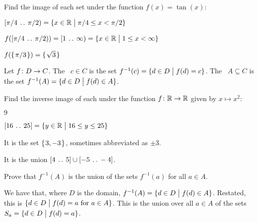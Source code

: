 \documentclass{ibl}  %
\begin{document}
\begin{ex}
Find the image of each set under the function $f(x)=\tan(x)$:
\begin{items}
\item $[\pi/4\:\mathinner{\ldotp\ldotp}\:\pi/2)=\{x\in\mathbb{R} \bigm| \pi/4\leq x<\pi/2\}$
\item {}
\end{items}
\begin{ans}
\begin{items}
\item $f([\pi/4\:\mathinner{\ldotp\ldotp}\:\pi/2))=[1\:\mathinner{\ldotp\ldotp}\:\infty)
             =\{x\in\mathbb{R} \bigm| 1\leq x<\infty\}$ 
\item $f(\mbox{$\{\hspace{0.1em}\pi/3\hspace{0.1em}\}$})=\mbox{$\{\hspace{0.1em}\sqrt{3}\hspace{0.1em}\}$}$
\end{items}
\end{ans}
\end{ex}

\begin{df}
Let $\mbox{$f\colon D\to C$}$.
The ~$c\in C$ is
the set $f^{-1}(c)=\{d\in D \bigm| f(d)=c\}$.
The ~$A\subseteq C$
is the set $f^{-1}(A)=\{d\in D \bigm| f(d)\in A\}$.   
\end{df}

\begin{ex}
Find the inverse image of each under the function $\mbox{$f\colon \mathbb{R}\to \mathbb{R}$}$ 
given by $x\mapsto x^2$:
\begin{items}
\item $9$
\item $[16\:\mathinner{\ldotp\ldotp}\:25]=\{y\in\mathbb{R} \bigm| 16\leq y\leq 25\}$
\end{items}
\begin{ans}
\begin{items}
\item It is the set $\mbox{$\{\hspace{0.1em}3,-3\hspace{0.1em}\}$}$, sometimes abbreviated as $\pm 3$.
\item It is the union $[4\:\mathinner{\ldotp\ldotp}\:5]\cup [-5\:\mathinner{\ldotp\ldotp}\:-4]$.    
\end{items}
\end{ans}
\end{ex}

\begin{ex}
Prove that $f^{-1}(A)$ is the union of the sets $f^{-1}(a)$ for all $a\in A$.
\begin{ans}
We have that, where $D$ is the domain, 
$f^{-1}(A)=\{d\in D \bigm| f(d)\in A\}$.
Restated, this is $\{d\in D \bigm| \text{$f(d)=a$ for $a\in A$}\}$.
This is the union over all $a\in A$ of the 
sets $S_a=\{d\in D \bigm| f(d)=a\}$.  
\end{ans}
\end{ex}
\end{document}
